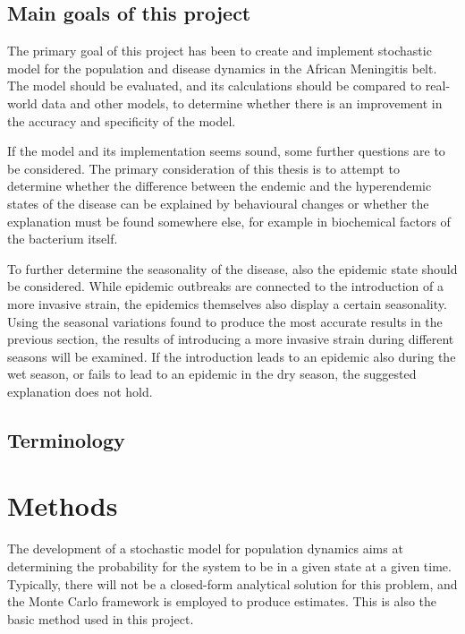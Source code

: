 \documentclass[10pt,a4paper]{article}
\begin{document}
\subsection{Main goals of this project}

The primary goal of this project has been to create and implement stochastic model for the population and disease dynamics in the African Meningitis belt. The model should be evaluated, and its calculations should be compared to real-world data and other models, to determine whether there is an improvement in the accuracy and specificity of the model.

If the model and its implementation seems sound, some further questions are to be considered. The primary consideration of this thesis is to attempt to determine whether the difference between the endemic and the hyperendemic states of the disease can be explained by behavioural changes or whether the explanation must be found somewhere else, for example in biochemical factors of the bacterium itself.

To further determine the seasonality of the disease, also the epidemic state should be considered. While epidemic outbreaks are connected to the introduction of a more invasive strain, the epidemics themselves also display a certain seasonality. Using the seasonal variations found to produce the most accurate results in the previous section, the results of introducing a more invasive strain during different seasons will be examined. If the introduction leads to an epidemic also during the wet season, or fails to lead to an epidemic in the dry season, the suggested explanation does not hold.


\subsection{Terminology}

\section{Methods}

The development of a stochastic model for population dynamics aims at determining the probability for the system to be in a given state at a given time. Typically, there will not be a closed-form analytical solution for this problem, and the Monte Carlo framework is employed to produce estimates. This is also the basic method used in this project.
\end{document}

